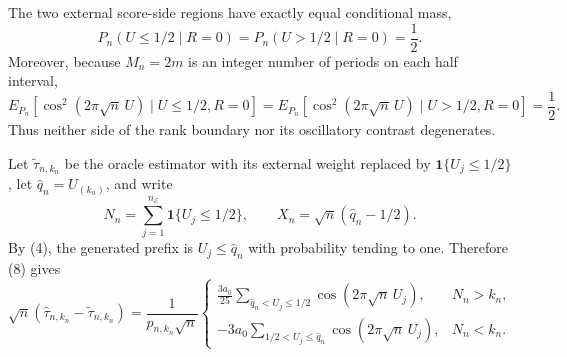 The two external score-side regions have exactly equal conditional mass,
\[
 P_n(U\leq1/2\mid R=0)=P_n(U>1/2\mid R=0)=\frac12.
\tag{9}
\]
Moreover, because \(M_n=2m\) is an integer number of periods on each half interval,
\[
 E_{P_n}[\cos^2(2\pi\sqrt n\,U)\mid U\leq1/2,R=0]
 =E_{P_n}[\cos^2(2\pi\sqrt n\,U)\mid U>1/2,R=0]
 =\frac12.
\tag{10}
\]
Thus neither side of the rank boundary nor its oscillatory contrast degenerates.

Let \(\widetilde\tau_{n,k_n}\) be the oracle estimator with its external weight replaced by \(\mathbf1\{U_j\leq1/2\}\), let \(\widehat q_n=U_{(k_n)}\), and write
\[
 N_n=\sum_{j=1}^{n_{\mathcal E}}\mathbf1\{U_j\leq1/2\},
 \qquad X_n=\sqrt n(\widehat q_n-1/2).
\]
By (4), the generated prefix is \(U_j\leq\widehat q_n\) with probability tending to one.  Therefore (8) gives
\[
 \sqrt n(\widehat\tau_{n,k_n}-\widetilde\tau_{n,k_n})
 =\frac1{p_{n,k_n}\sqrt n}
 \begin{cases}
 \displaystyle \frac{3a_0}{25}
 \sum_{\widehat q_n<U_j\leq1/2}
 \cos(2\pi\sqrt n\,U_j),&N_n>k_n,\\[6pt]
 \displaystyle -3a_0
 \sum_{1/2<U_j\leq\widehat q_n}
 \cos(2\pi\sqrt n\,U_j),&N_n<k_n.
 \end{cases}
\tag{11}
\]

